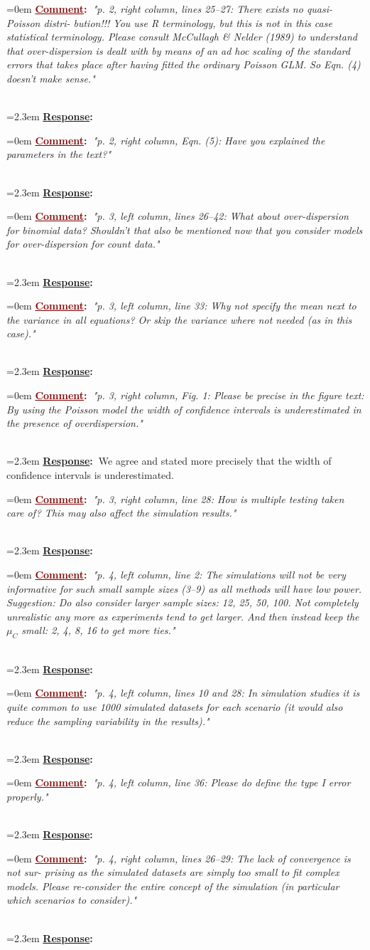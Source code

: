 \documentclass[12pt]{article}
\newcommand{\comment}[1]{
	\vspace{2em} \noindent \hangindent=0em \textbf{\textcolor{Maroon}{\uline{Comment}:~}}\emph{"#1"}
	}
\newcommand{\response}[1]{
	\\[0.25em] 
	\hangindent=2.3em \textbf{\textcolor{NavyBlue}{\uline{Response}:~}}#1 
	}
\begin{document}
\comment{p. 2, right column, lines 25–27: There exists no quasi-Poisson distri-
bution!!! You use R terminology, but this is not in this case statistical
terminology. Please consult McCullagh \& Nelder (1989) to understand
that over-dispersion is dealt with by means of an ad hoc scaling of the
standard errors that takes place after having fitted the ordinary Poisson
GLM. So Eqn. (4) doesn’t make sense.}
\response{}

\comment{p. 2, right column, Eqn. (5): Have you explained the parameters in
the text?}
\response{}

\comment{p. 3, left column, lines 26–42: What about over-dispersion for binomial
data? Shouldn’t that also be mentioned now that you consider models
for over-dispersion for count data.}
\response{}

\comment{p. 3, left column, line 33: Why not specify the mean next to the
variance in all equations? Or skip the variance where not needed (as
in this case).}
\response{}

\comment{p. 3, right column, Fig. 1: Please be precise in the figure text: By using
the Poisson model the width of confidence intervals is underestimated
in the presence of overdispersion.}
\response{We agree and stated more precisely that the width of confidence intervals is underestimated.}

\comment{p. 3, right column, line 28: How is multiple testing taken care of? This
may also affect the simulation results.}
\response{}

\comment{p. 4, left column, line 2: The simulations will not be very informative
for such small sample sizes (3–9) as all methods will have low power.
Suggestion: Do also consider larger sample sizes: 12, 25, 50, 100. Not
completely unrealistic any more as experiments tend to get larger. And
then instead keep the $\mu_C$ small: 2, 4, 8, 16 to get more ties.}
\response{}

\comment{p. 4, left column, lines 10 and 28: In simulation studies it is quite
common to use 1000 simulated datasets for each scenario (it would
also reduce the sampling variability in the results).}
\response{}

\comment{p. 4, left column, line 36: Please do define the type I error properly.}
\response{}

\comment{p. 4, right column, lines 26–29: The lack of convergence is not sur-
prising as the simulated datasets are simply too small to fit complex
models. Please re-consider the entire concept of the simulation (in
particular which scenarios to consider).}
\response{}
\end{document}
